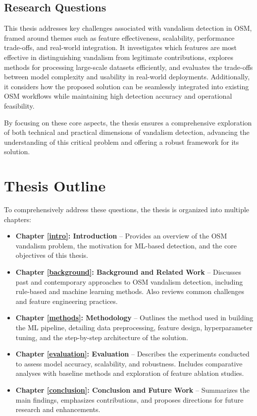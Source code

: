 \documentclass[
    13pt, %
    a4paper, %
    twoside, 
    DIV14, %
    listof=totoc, %
    bibliography=totoc, %
    index=totoc, %
    headsepline
]{scrreprt}
\begin{document}
\subsection*{Research Questions}

This thesis addresses key challenges associated with vandalism detection in OSM, framed around themes such as feature effectiveness, scalability, performance trade-offs, and real-world integration. It investigates which features are most effective in distinguishing vandalism from legitimate contributions, explores methods for processing large-scale datasets efficiently, and evaluates the trade-offs between model complexity and usability in real-world deployments. Additionally, it considers how the proposed solution can be seamlessly integrated into existing OSM workflows while maintaining high detection accuracy and operational feasibility.

\vspace*{1cm}
\noindent By focusing on these core aspects, the thesis ensures a comprehensive exploration of both technical and practical dimensions of vandalism detection, advancing the understanding of this critical problem and offering a robust framework for its solution.


\section{Thesis Outline}

To comprehensively address these questions, the thesis is organized into multiple chapters:

\begin{itemize}
  \item \textbf{Chapter \ref{intro}: Introduction} – Provides an overview of the OSM vandalism problem, the motivation for ML-based detection, and the core objectives of this thesis.
  \item \textbf{Chapter \ref{background}: Background and Related Work} – Discusses past and contemporary approaches to OSM vandalism detection, including rule-based and machine learning methods. Also reviews common challenges and feature engineering practices.
  \item \textbf{Chapter \ref{methods}: Methodology} – Outlines the method used in building the ML pipeline, detailing data preprocessing, feature design, hyperparameter tuning, and the step-by-step architecture of the solution.
  \item \textbf{Chapter \ref{evaluation}: Evaluation} – Describes the experiments conducted to assess model accuracy, scalability, and robustness. Includes comparative analyses with baseline methods and exploration of feature ablation studies.
  \item \textbf{Chapter \ref{conclusion}: Conclusion and Future Work} – Summarizes the main findings, emphasizes contributions, and proposes directions for future research and enhancements.
\end{itemize}
\end{document}
